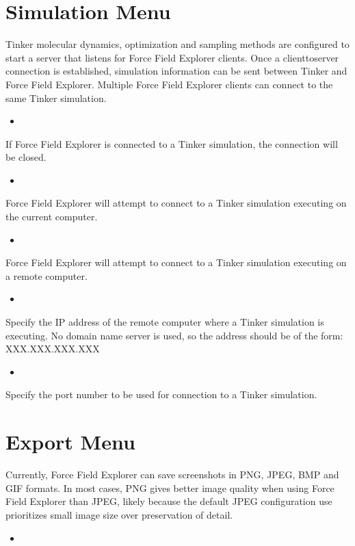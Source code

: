 \documentclass[letterpaper,11pt,english]{sphinxmanual}
\begin{document}
\section{Simulation Menu}
\label{\detokenize{text/menus:simulation-menu}}
Tinker molecular dynamics, optimization and sampling methods are configured to start a server that listens for Force Field Explorer clients. Once a client\sphinxhyphen{}to\sphinxhyphen{}server connection is established, simulation information can be sent between Tinker and Force Field Explorer. Multiple Force Field Explorer clients can connect to the same Tinker simulation.
\begin{itemize}
\item {} 

\end{itemize}

If Force Field Explorer is connected to a Tinker simulation, the connection will be closed.
\begin{itemize}
\item {} 

\end{itemize}

Force Field Explorer will attempt to connect to a Tinker simulation executing on the current computer.
\begin{itemize}
\item {} 

\end{itemize}

Force Field Explorer will attempt to connect to a Tinker simulation executing on a remote computer.
\begin{itemize}
\item {} 

\end{itemize}

Specify the IP address of the remote computer where a Tinker simulation is executing. No domain name server is used, so the address should be of the form: XXX.XXX.XXX.XXX
\begin{itemize}
\item {} 

\end{itemize}

Specify the port number to be used for connection to a Tinker simulation.


\section{Export Menu}
\label{\detokenize{text/menus:export-menu}}
Currently, Force Field Explorer can save screenshots in PNG, JPEG, BMP and GIF formats. In most cases, PNG gives better image quality when using Force Field Explorer than JPEG, likely because the default JPEG configuration use prioritizes small image size over preservation of detail.
\begin{itemize}
\item {} 

\end{itemize}
\end{document}
